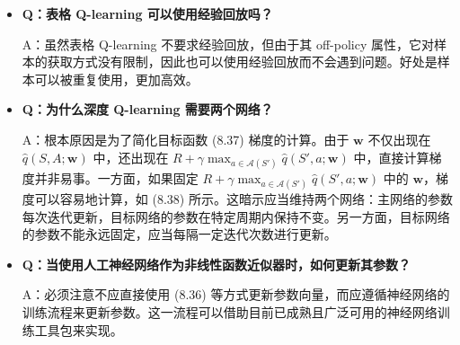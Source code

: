 \documentclass[UTF8]{article}
\begin{document}
\begin{itemize}
    A：原因在于目标函数 (8.37)。为良好定义目标函数，必须确定 $S, A, R, S'$ 的概率分布。一旦 $(S, A)$ 给定，$R$ 和 $S'$ 的分布由系统模型决定。描述状态-动作对 $(S, A)$ 分布的最简单方式是假设其均匀分布。然而实践中状态-动作样本是序列化生成的，不一定均匀分布，因此需要打破序列中样本的相关性来满足均匀分布的假设。通过从回放缓冲区中均匀抽样来进行经验回放，正是出于这一数学原因。经验回放的一个额外好处是每个样本可能被多次使用，提高数据效率。

    \item \textbf{Q：表格 Q-learning 可以使用经验回放吗？}
    
    A：虽然表格 Q-learning 不要求经验回放，但由于其 off-policy 属性，它对样本的获取方式没有限制，因此也可以使用经验回放而不会遇到问题。好处是样本可以被重复使用，更加高效。

    \item \textbf{Q：为什么深度 Q-learning 需要两个网络？}
    
    A：根本原因是为了简化目标函数 (8.37) 梯度的计算。由于 $\boldsymbol{w}$ 不仅出现在 $\hat{q}(S, A; \boldsymbol{w})$ 中，还出现在 $R + \gamma \max_{a \in \mathcal{A}(S')} \hat{q}(S', a; \boldsymbol{w})$ 中，直接计算梯度并非易事。一方面，如果固定 $R + \gamma \max_{a \in \mathcal{A}(S')} \hat{q}(S', a; \boldsymbol{w})$ 中的 $\boldsymbol{w}$，梯度可以容易地计算，如 (8.38) 所示。这暗示应当维持两个网络：主网络的参数每次迭代更新，目标网络的参数在特定周期内保持不变。另一方面，目标网络的参数不能永远固定，应当每隔一定迭代次数进行更新。

    \item \textbf{Q：当使用人工神经网络作为非线性函数近似器时，如何更新其参数？}
    
    A：必须注意不应直接使用 (8.36) 等方式更新参数向量，而应遵循神经网络的训练流程来更新参数。这一流程可以借助目前已成熟且广泛可用的神经网络训练工具包来实现。
\end{itemize}
\end{document}
